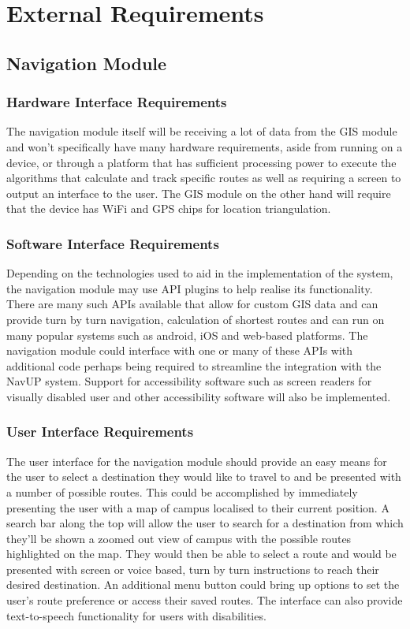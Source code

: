 \documentclass[11pt]{article}
\begin{document}
\section{External Requirements}

\subsection{Navigation Module}
\subsubsection{Hardware Interface Requirements}
  
The navigation module itself will be receiving a lot of data from the GIS module and won’t specifically have many hardware requirements,  aside from running on a device, or through a platform that has sufficient processing power to execute the algorithms that calculate and track specific routes as well as requiring a screen to output an interface to the user. The GIS module on the other hand will require that the device has WiFi and GPS chips for location triangulation.
  
 \subsubsection{Software Interface Requirements}
  
Depending on the technologies used to aid in the implementation of the system, the navigation module may use API plugins to help realise its functionality. There are many such APIs available that allow for custom GIS data and can provide turn by turn navigation, calculation of shortest routes and can run on many popular systems such as android, iOS and web-based platforms. The navigation module could interface with one or many of these APIs with additional code perhaps being required to streamline the integration with the NavUP system. Support for accessibility software such as screen readers for visually disabled user and other accessibility software will also be implemented.
  
 \subsubsection{User Interface Requirements}
  
The user interface for the navigation module should provide an easy means for the user to select a destination they would like to travel to and be presented with a number of possible routes. This could be accomplished by immediately presenting the user with a map of campus localised to their current position. A search bar along the top will allow the user to search for a destination from which they’ll be shown a zoomed out view of campus with the possible routes highlighted on the map. They would then be able to select a route and would be presented with screen or voice based, turn by turn instructions to reach their desired destination. An additional menu button could bring up options to set the user’s route preference or access their saved routes. The interface can also provide text-to-speech functionality for users with disabilities.
  
\end{document}
